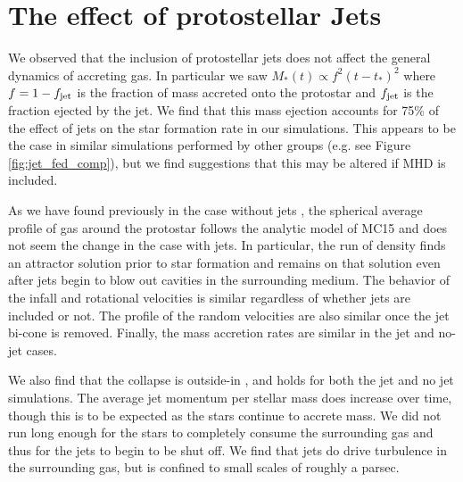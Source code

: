 \documentclass[../dissertation.tex]{subfiles}
\begin{document}
\section{The effect of protostellar Jets}

We observed that the inclusion of protostellar jets does not affect the general dynamics of accreting gas.
In particular we saw $M_*(t) \propto f^2 (t-t_*)^2$ where $f = 1 - f_{\rm jet}$ is the fraction of mass accreted onto the protostar and $f_{\rm jet}$ is the fraction ejected by the jet.
We find that this mass ejection accounts for 75\% of the effect of jets on the star formation rate in our simulations.
This appears to be the case in similar simulations performed by other groups (e.g. see Figure \ref{fig:jet_fed_comp}), but we find suggestions that this may be altered if MHD is included.

As we have found previously in the case without jets \citep{2017MNRAS.465.1316M}, the spherical average profile of gas around the protostar follows the analytic model of MC15 and does not seem the change in the case with jets.  In particular, the run of density finds an attractor solution prior to star formation and remains on that solution even after jets begin to blow out cavities in the surrounding medium.
The behavior of the infall and rotational velocities is similar regardless of whether jets are included or not.
The profile of the random velocities are also similar once the jet bi-cone is removed.  Finally, the mass accretion rates are similar in the jet and no-jet cases.

We also find that the collapse is outside-in  \citep{2017MNRAS.465.1316M}, and holds for both the jet and no jet simulations.
The average jet momentum per stellar mass does increase over time, though this is to be expected as the stars continue to accrete mass.
We did not run long enough for the stars to completely consume the surrounding gas and thus for the jets to begin to be shut off.
We find that jets do drive turbulence in the surrounding gas, but is confined to small scales of roughly a parsec.
\end{document}
